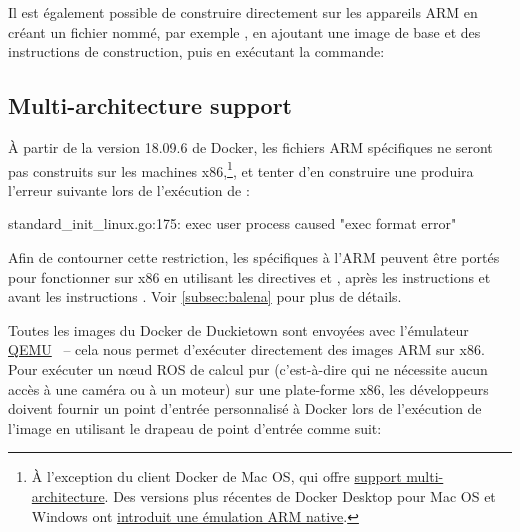 %
Il est également possible de construire directement sur les appareils ARM en créant un fichier nommé, par exemple , en ajoutant une image de base et des instructions de construction, puis en exécutant la commande:

%
\subsection{Multi-architecture support}

À partir de la version 18.09.6 de Docker, les fichiers ARM spécifiques  ne seront pas construits sur les machines x86,\footnote{À l'exception du client Docker de Mac OS, qui offre \href{https://docs.docker.com/docker-for-mac/multi-arch/}{support multi-architecture}. Des versions plus récentes de Docker Desktop pour Mac OS et Windows ont \href{https://engineering.docker.com/2019/04/multi-arch-images/}{introduit une émulation ARM native}.}, et tenter d'en construire une produira l'erreur suivante lors de l'exécution de :

\begin{pclisting}
standard_init_linux.go:175: exec user process caused "exec format error"
\end{pclisting}
%
Afin de contourner cette restriction, les  spécifiques à l'ARM peuvent être portés pour fonctionner sur x86 en utilisant les directives  et , après les instructions  et avant les instructions . Voir \autoref{subsec:balena} pour plus de détails.

Toutes les images du Docker de Duckietown sont envoyées avec l'émulateur \href{https://www.qemu.org}{QEMU}~\citep{bellard2005qemu} -- cela nous permet d'exécuter directement des images ARM sur x86. Pour exécuter un nœud ROS de calcul pur (c'est-à-dire qui ne nécessite aucun accès à une caméra ou à un moteur) sur une plate-forme x86, les développeurs doivent fournir un point d'entrée personnalisé à Docker lors de l'exécution de l'image en utilisant le drapeau de point d'entrée comme suit:

